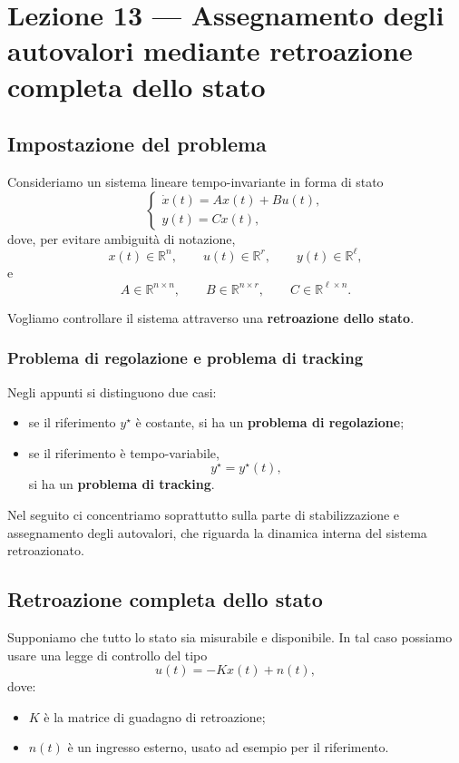 \chapter{Lezione 13 --- Assegnamento degli autovalori mediante retroazione completa dello stato}

\section{Impostazione del problema}

Consideriamo un sistema lineare tempo-invariante in forma di stato
\[
\begin{cases}
\dot x(t)=Ax(t)+Bu(t),\\[4pt]
y(t)=Cx(t),
\end{cases}
\]
dove, per evitare ambiguità di notazione,
\[
x(t)\in\mathbb{R}^n,\qquad
u(t)\in\mathbb{R}^r,\qquad
y(t)\in\mathbb{R}^\ell,
\]
e
\[
A\in\mathbb{R}^{n\times n},\qquad
B\in\mathbb{R}^{n\times r},\qquad
C\in\mathbb{R}^{\ell\times n}.
\]

Vogliamo controllare il sistema attraverso una \textbf{retroazione dello stato}.

\subsection{Problema di regolazione e problema di tracking}

Negli appunti si distinguono due casi:
\begin{itemize}
    \item se il riferimento \(y^\star\) è costante, si ha un \textbf{problema di regolazione};
    \item se il riferimento è tempo-variabile,
    \[
    y^\star=y^\star(t),
    \]
    si ha un \textbf{problema di tracking}.
\end{itemize}

Nel seguito ci concentriamo soprattutto sulla parte di stabilizzazione e assegnamento degli autovalori,
che riguarda la dinamica interna del sistema retroazionato.

\section{Retroazione completa dello stato}

Supponiamo che tutto lo stato sia misurabile e disponibile.
In tal caso possiamo usare una legge di controllo del tipo
\[
u(t)=-Kx(t)+n(t),
\]
dove:
\begin{itemize}
    \item \(K\) è la matrice di guadagno di retroazione;
    \item \(n(t)\) è un ingresso esterno, usato ad esempio per il riferimento.
\end{itemize}

